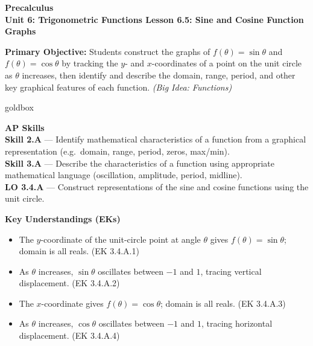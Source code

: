 \documentclass[10pt]{article}
\newcommand{\CourseName}{Precalculus}
\newcommand{\UnitNumberName}{Unit 6: Trigonometric Functions \quad}
\newcommand{\LessonNumberName}{Lesson 6.5: Sine and Cosine Function Graphs}
\begin{document}
\begin{center}
    {\Large\bfseries \CourseName \\
    {\small\bfseries \UnitNumberName \LessonNumberName}}
\end{center}

\begin{tcolorbox}[colback=sky, colframe=navy, boxrule=0.9pt, arc=2mm,
    left=2mm, right=2mm, top=1.5mm, bottom=1.5mm]
    \textbf{Primary Objective:} Students construct the graphs of $f(\theta)=\sin\theta$ and
    $f(\theta)=\cos\theta$ by tracking the $y$- and $x$-coordinates of a point on the unit
    circle as $\theta$ increases, then identify and describe the domain, range, period, and
    other key graphical features of each function. \quad \textit{(Big Idea: Functions)}
\end{tcolorbox}

\renewcommand{\arraystretch}{1.6}
\begin{skillbox}{goldbox}
\begin{minipage}[t]{0.47\linewidth}\vspace{0pt}
    \textbf{AP Skills}\\[4pt]
    \textbf{Skill 2.A} --- Identify mathematical characteristics of a function from a
    graphical representation (e.g.\ domain, range, period, zeros, max/min).\\[4pt]
    \textbf{Skill 3.A} --- Describe the characteristics of a function using appropriate
    mathematical language (oscillation, amplitude, period, midline).\\[4pt]
    \textbf{LO 3.4.A} --- Construct representations of the sine and cosine functions
    using the unit circle.
\end{minipage}
\hfill
\begin{minipage}[t]{0.47\linewidth}\vspace{0pt}
    \textbf{Key Understandings (EKs)}\\[4pt]
    \begin{itemize}[leftmargin=1.2em, itemsep=3pt]
        \item The $y$-coordinate of the unit-circle point at angle $\theta$ gives
              $f(\theta)=\sin\theta$; domain is all reals. (EK 3.4.A.1)
        \item As $\theta$ increases, $\sin\theta$ oscillates between $-1$ and $1$,
              tracing vertical displacement. (EK 3.4.A.2)
        \item The $x$-coordinate gives $f(\theta)=\cos\theta$; domain is all reals.
              (EK 3.4.A.3)
        \item As $\theta$ increases, $\cos\theta$ oscillates between $-1$ and $1$,
              tracing horizontal displacement. (EK 3.4.A.4)
    \end{itemize}
\end{minipage}
\end{skillbox}
\end{document}
